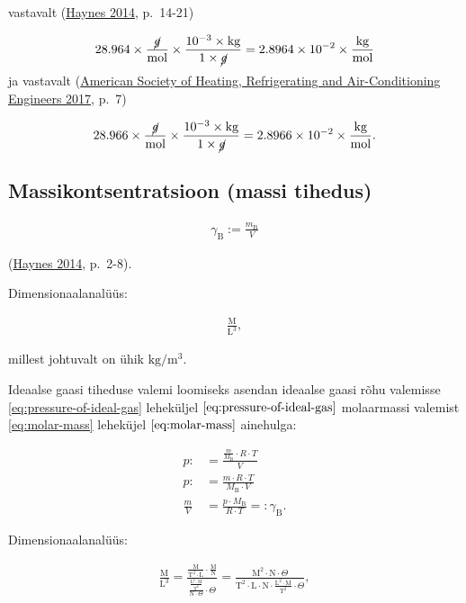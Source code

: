 \documentclass[
  12pt,
  a4paper,
  onecolumn, twoside]{article}
\begin{document}
vastavalt (\protect\hyperlink{ref-haynes_2014_crc}{Haynes 2014}, p.~14-21)

\[\mathrm{28.964 \times \frac{\cancel{g}}{mol} \times \frac{10^{-3} \times kg}{1 \times \cancel{g}} = 2.8964 \times 10^{-2} \times \frac{kg}{mol}}\]
ja vastavalt (\protect\hyperlink{ref-American_Society_of_Heating_Refrigerating_and_Air-Conditioning_Engineers2017-im}{American Society of Heating, Refrigerating and Air-Conditioning Engineers 2017}, p.~7)

\[\mathrm{28.966 \times \frac{\cancel{g}}{mol} \times \frac{10^{-3} \times kg}{1 \times \cancel{g}} = 2.8966 \times 10^{-2} \times \frac{kg}{mol}}.\]

\hypertarget{massikontsentratsioon-massi-tihedus}{%
\subsection{Massikontsentratsioon (massi tihedus)}\label{massikontsentratsioon-massi-tihedus}}

\begin{align}
γ_\mathrm{B} := \frac{m_\mathrm{B}}{V}
\label{eq:mass-concentration}
\end{align}

(\protect\hyperlink{ref-haynes_2014_crc}{Haynes 2014}, p.~2-8).

Dimensionaalanalüüs:

\begin{align}
\mathrm{\frac{M}{L^3}},
\label{eq:dimensional-analysis-for-mass-concentration}
\end{align}

millest johtuvalt on ühik \(\unit{\kilogram\per\cubic\metre}\).

Ideaalse gaasi tiheduse valemi loomiseks asendan ideaalse gaasi rõhu valemisse \eqref{eq:pressure-of-ideal-gas} leheküljel \(\pageref{eq:pressure-of-ideal-gas}\) molaarmassi valemist \eqref{eq:molar-mass} leheküjel \(\pageref{eq:molar-mass}\) ainehulga:

\begin{align}
p :&= \frac{\frac{m}{M_\mathrm{B}} \cdot R \cdot T}{V}\\
p :&= \frac{m \cdot R \cdot T}{M_\mathrm{B} \cdot V}\\
\frac{m}{V} &= \frac{p \cdot M_\mathrm{B}}{R \cdot T} =: \gamma_\mathrm{B}.
\label{eq:mass-concentration-of-ideal-gas}
\end{align}

Dimensionaalanalüüs:

\begin{align}
\mathrm{\frac{M}{L^3}} = \frac{\mathrm{\frac{M}{T^2 \cdot L} \cdot \frac{M}{N}}}{\frac{\mathrm{\frac{L^2 \cdot M}{T^2}}}{\mathrm{N} \cdot \Theta} \cdot \Theta} = \frac{\mathrm{M^2 \cdot N} \cdot \Theta}{\mathrm{T^2 \cdot L \cdot N \cdot \frac{L^2 \cdot M}{T^2}} \cdot \Theta},
\label{eq:dimensional-analysis-for-mass-concentration-of-ideal-gas}
\end{align}
\end{document}
